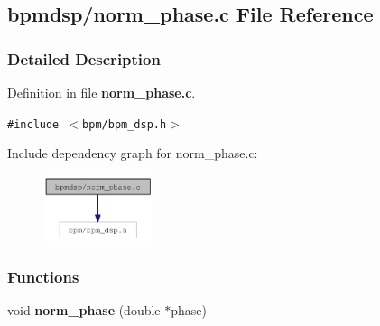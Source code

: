 \subsection{bpmdsp/norm\_\-phase.c File Reference}
\label{norm__phase_8c}


\subsubsection{Detailed Description}


Definition in file {\bf norm\_\-phase.c}.

{\tt \#include $<$bpm/bpm\_\-dsp.h$>$}\par


Include dependency graph for norm\_\-phase.c:\nopagebreak
\begin{figure}[H]
\begin{center}
\leavevmode
\includegraphics[width=91pt]{norm__phase_8c__incl}
\end{center}
\end{figure}
\subsubsection*{Functions}
\begin{CompactItemize}
\item 
void {\bf norm\_\-phase} (double $\ast$phase)
\end{CompactItemize}

